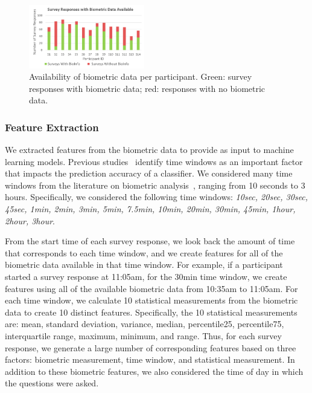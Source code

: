 \begin{figure}
  \centering
      \includegraphics[width=0.45\textwidth]{DuringTheDay.png}
  \caption{Availability of biometric data per participant. Green: survey responses with biometric
  data; red: responses with no biometric data.}
   \label{surveyBio}
   \vspace*{-6mm}
\end{figure}


\subsubsection{Feature Extraction}
We extracted features from the biometric data to provide as input to machine learning models. Previous studies~ \cite{vorburger05,zuger2015interruptibility} identify time windows as an important factor that impacts the prediction accuracy of a classifier. We considered many time windows from the literature on biometric analysis~\cite{zuger18}, ranging from 10 seconds to 3 hours. Specifically, we considered the following time windows: \textit{10sec, 20sec, 30sec, 45sec, 1min, 2min, 3min, 5min, 7.5min, 10min, 20min, 30min, 45min, 1hour, 2hour, 3hour}.

From the start time of each survey response, we look back the amount of time that corresponds to each time window, and we create features for all of the biometric data available in that time window. For example, if a participant started a survey response at 11:05am, for the 30min time window, we create features using all of the available biometric data from 10:35am to 11:05am. For each time window, we calculate 10 statistical measurements from the biometric data to create 10 distinct features. Specifically, the 10 statistical measurements are: mean, standard deviation, variance, median, percentile25, percentile75, interquartile range, maximum, minimum, and range. Thus, for each survey response, we generate a large number of corresponding features based on three factors: biometric measurement, time window, and statistical measurement. In addition to these biometric features, we also considered the time of day in which the questions were asked.

